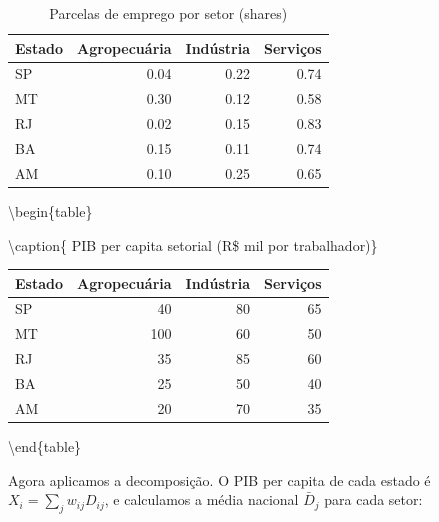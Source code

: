 \documentclass[
]{article}
\newenvironment{Shaded}{\begin{snugshade}}{\end{snugshade}}
\newcommand{\AttributeTok}[1]{\textcolor[rgb]{0.13,0.29,0.53}{#1}}
\newcommand{\FunctionTok}[1]{\textcolor[rgb]{0.13,0.29,0.53}{\textbf{#1}}}
\newcommand{\NormalTok}[1]{#1}
\newcommand{\SpecialCharTok}[1]{\textcolor[rgb]{0.81,0.36,0.00}{\textbf{#1}}}
\newcommand{\StringTok}[1]{\textcolor[rgb]{0.31,0.60,0.02}{#1}}
\begin{document}
\begin{table}

\caption{\label{tab:pib-dados}\label{tab:pib-shares} Parcelas de emprego por setor (shares)}
\centering
\begin{tabular}[t]{l|r|r|r}
\hline
Estado & Agropecuária & Indústria & Serviços\\
\hline
SP & 0.04 & 0.22 & 0.74\\
\hline
MT & 0.30 & 0.12 & 0.58\\
\hline
RJ & 0.02 & 0.15 & 0.83\\
\hline
BA & 0.15 & 0.11 & 0.74\\
\hline
AM & 0.10 & 0.25 & 0.65\\
\hline
\end{tabular}
\end{table}

\begin{Shaded}
\end{Shaded}

\textbackslash begin\{table\}

\textbackslash caption\{\label{tab:pib-dados}\label{tab:pib-prod} PIB per capita setorial (R\$ mil por trabalhador)\}
\centering

\begin{tabular}[t]{l|r|r|r}
\hline
Estado & Agropecuária & Indústria & Serviços\\
\hline
SP & 40 & 80 & 65\\
\hline
MT & 100 & 60 & 50\\
\hline
RJ & 35 & 85 & 60\\
\hline
BA & 25 & 50 & 40\\
\hline
AM & 20 & 70 & 35\\
\hline
\end{tabular}

\textbackslash end\{table\}

Agora aplicamos a decomposição. O PIB per capita de cada estado é \(X_i = \sum_j w_{ij}D_{ij}\), e calculamos a média nacional \(\bar{D}_j\) para cada setor:
\end{document}
